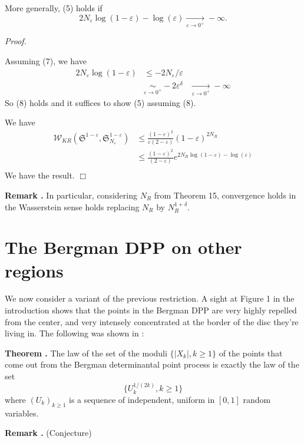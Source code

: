 \documentclass[11pt]{article}
\newcommand{\qed}{\hfill$\Box$}
\newcounter{cnt}
\newcommand{\cnt}{\thecnt \stepcounter{cnt}}
\begin{document}
More generally, (5) holds if 
\begin{equation}
2N_\varepsilon  \log(1-\varepsilon) - \log(\varepsilon) \xrightarrow[\varepsilon \to 0^+]{} - \infty .
\end{equation}

\textit{Proof.}

Assuming (7), we have
\begin{align*}
    2N_\varepsilon \log(1-\varepsilon) &\le - 2N_\varepsilon / \varepsilon \\
                                       &\underset{\varepsilon \to 0^+}{\sim} - 2 \varepsilon^\delta
                                       &\xrightarrow[\varepsilon \to 0^+]{} - \infty 
\end{align*}
So (8) holds and it suffices to show (5) assuming (8).

We have
\begin{align*}
    \mathcal{W}_{KR}(\mathfrak{S}^{1-\varepsilon}, \mathfrak{S}_{N_\varepsilon }^{1-\varepsilon}) 
    &\le \frac{(1-\varepsilon)^2}{\varepsilon(2-\varepsilon)} (1-\varepsilon)^{2 N_R} \\
    &\le \frac{(1-\varepsilon)^2}{(2-\varepsilon)} e^{2 N_R \log(1-\varepsilon) - \log(\varepsilon)} \\
\end{align*}
We have the result. \qed

\textbf{Remark \cnt.} In particular, considering $N_R$ from Theorem 15, convergence holds in the Wasserstein sense holds replacing $ N_R$ by $ N_R^{1+\delta} $.

\section{The Bergman DPP on other regions}

We now consider a variant of the previous restriction. A sight at Figure 1 in the introduction shows that the points in the Bergman DPP are very highly repelled from the center, and very intensely concentrated at the border of the disc they're living in. The following was shown in \cite{ZerosGaussianPowerSeries} :

\textbf{Theorem \cnt.} The law of the set of the moduli $\{|X_k|, k \ge 1\}$ of the points that come out from the Bergman determinantal point process is exactly the law of the set
\[
\{U_k^{1/(2k)}, k \ge 1\}
\]
where $(U_k)_{k \ge 1}$ is a sequence of independent, uniform in $[0,1]$ random variables.

\textbf{Remark \cnt.} (Conjecture)
\end{document}
